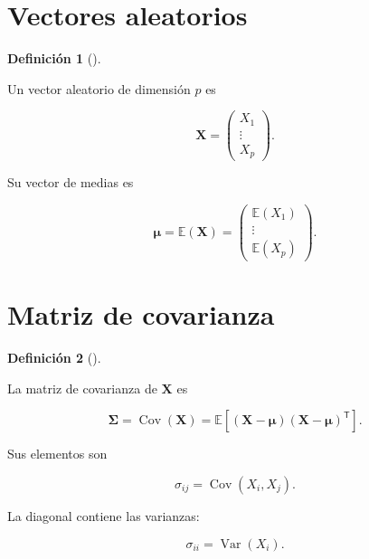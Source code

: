 \documentclass[
  spanish,
  10.5pt,
  letterpaper,
  DIV=11,
  numbers=noendperiod,
  oneside,
  open=any]{scrreprt}
\theoremstyle{definition}
\newtheorem{definition}{Definición}[chapter]
\theoremstyle{definition}
\theoremstyle{plain}
\theoremstyle{remark}
\begin{document}
\section*{Vectores aleatorios}\label{vectores-aleatorios}


\begin{definition}[]\protect\hypertarget{def-vector-aleatorio}{}\label{def-vector-aleatorio}

Un vector aleatorio de dimensión \(p\) es

\[
\mathbf{X}
=
\begin{pmatrix}
X_1\\
\vdots\\
X_p
\end{pmatrix}.
\]

\end{definition}

Su vector de medias es

\[
\boldsymbol{\mu}
=
\mathbb{E}(\mathbf{X})
=
\begin{pmatrix}
\mathbb{E}(X_1)\\
\vdots\\
\mathbb{E}(X_p)
\end{pmatrix}.
\]

\section*{Matriz de covarianza}\label{matriz-de-covarianza-1}


\begin{definition}[]\protect\hypertarget{def-matriz-covarianza}{}\label{def-matriz-covarianza}

La matriz de covarianza de \(\mathbf{X}\) es

\[
\boldsymbol{\Sigma}
=
\operatorname{Cov}(\mathbf{X})
=
\mathbb{E}
\left[
(\mathbf{X}-\boldsymbol{\mu})
(\mathbf{X}-\boldsymbol{\mu})^{\mathsf T}
\right].
\]

\end{definition}

Sus elementos son

\[
\sigma_{ij}
=
\operatorname{Cov}(X_i,X_j).
\]

La diagonal contiene las varianzas:

\[
\sigma_{ii}
=
\operatorname{Var}(X_i).
\]
\end{document}
